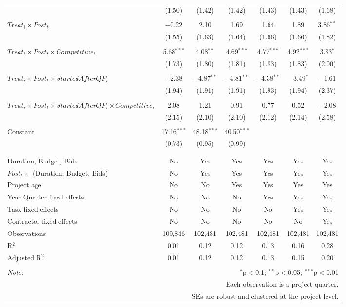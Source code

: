\documentclass[]{article}
\begin{document}
\begin{table}[H]
\begin{tabular}{@{\extracolsep{-3pt}}lcccccc}
  & (1.50) & (1.42) & (1.42) & (1.43) & (1.43) & (1.68) \\ 
  & & & & & & \\ 
 $Treat_i \times Post_t$ & $-$0.22 & 2.10 & 1.69 & 1.64 & 1.89 & 3.86$^{**}$ \\ 
  & (1.55) & (1.63) & (1.64) & (1.66) & (1.66) & (1.82) \\ 
  & & & & & & \\ 
 $Treat_i \times Post_t \times Competitive_i$ & 5.68$^{***}$ & 4.08$^{**}$ & 4.69$^{***}$ & 4.77$^{***}$ & 4.92$^{***}$ & 3.83$^{*}$ \\ 
  & (1.73) & (1.80) & (1.81) & (1.83) & (1.83) & (2.00) \\ 
  & & & & & & \\ 
 $Treat_i \times Post_t \times StartedAfterQP_i$ & $-$2.38 & $-$4.87$^{**}$ & $-$4.81$^{**}$ & $-$4.38$^{**}$ & $-$3.49$^{*}$ & $-$1.61 \\ 
  & (1.94) & (1.91) & (1.91) & (1.93) & (1.94) & (2.37) \\ 
  & & & & & & \\ 
 $Treat_i \times Post_t \times StartedAfterQP_i \times Competitive_i$ & 2.08 & 1.21 & 0.91 & 0.77 & 0.52 & $-$2.08 \\ 
  & (2.15) & (2.10) & (2.10) & (2.12) & (2.14) & (2.58) \\ 
  & & & & & & \\ 
 Constant & 17.16$^{***}$ & 48.18$^{***}$ & 40.50$^{***}$ &  &  &  \\ 
  & (0.73) & (0.95) & (0.99) &  &  &  \\ 
  & & & & & & \\ 
\hline \\[-1.8ex] 
Duration, Budget, Bids & No & Yes & Yes & Yes & Yes & Yes \\ 
$Post_t \times $  (Duration, Budget, Bids) & No & Yes & Yes & Yes & Yes & Yes \\ 
Project age & No & No & Yes & Yes & Yes & Yes \\ 
Year-Quarter fixed effects & No & No & No & Yes & Yes & Yes \\ 
Task fixed effects & No & No & No & No & Yes & Yes \\ 
Contractor fixed effects & No & No & No & No & No & Yes \\ 
Observations & 109,846 & 102,481 & 102,481 & 102,481 & 102,481 & 102,481 \\ 
R$^{2}$ & 0.01 & 0.12 & 0.12 & 0.13 & 0.16 & 0.28 \\ 
Adjusted R$^{2}$ & 0.01 & 0.12 & 0.12 & 0.13 & 0.15 & 0.20 \\ 
\hline 
\hline \\[-1.8ex] 
\textit{Note:}  & \multicolumn{6}{r}{$^{*}$p$<$0.1; $^{**}$p$<$0.05; $^{***}$p$<$0.01} \\ 
 & \multicolumn{6}{r}{Each observation is a project-quarter.} \\ 
 & \multicolumn{6}{r}{SEs are robust and clustered at the project level.} \\ 
\end{tabular} 
\end{table}
\end{document}
